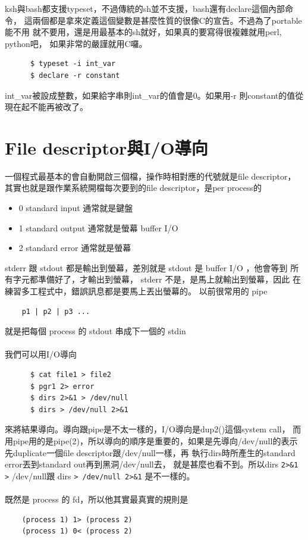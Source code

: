     ksh與bash都支援typeset，不過傳統的sh並不支援，bash還有declare這個內部命令，
    這兩個都是拿來定義這個變數是甚麼性質的很像C的宣告。不過為了portable能不用
    就不要用，還是用最基本的sh就好，如果真的要寫得很複雜就用perl, python吧，
    如果非常的嚴謹就用C囉。
    \begin{verbatim}
      $ typeset -i int_var
      $ declare -r constant
    \end{verbatim}
    int\_var被設成整數，如果給字串則int\_var的值會是0。如果用-r 
    則constant的值從現在起不能再被改了。

    \section{File descriptor與I/O導向}
    一個程式最基本的會自動開啟三個檔，操作時相對應的代號就是file descriptor，
    其實也就是跟作業系統開檔每次要到的file descriptor，是per process的
    \begin{itemize}
    \item 0  standard input   通常就是鍵盤
    \item 1  standard output  通常就是螢幕 buffer I/O
    \item 2  standard error   通常就是螢幕
    \end{itemize}
    stderr 跟 stdout 都是輸出到螢幕，差別就是 stdout 是 buffer I/O ，他會等到
    所有字元都準備好了，才輸出到螢幕， stderr 不是，是馬上就輸出到螢幕，因此
    在練習多工程式中，錯誤訊息都是要馬上丟出螢幕的。
    以前很常用的 pipe
    \begin{verbatim}
    p1 | p2 | p3 ...
    \end{verbatim}
    就是把每個 process 的 stdout 串成下一個的 stdin
    \\\\
    我們可以用I/O導向
    \begin{verbatim}
      $ cat file1 > file2
      $ pgr1 2> error
      $ dirs 2>&1 > /dev/null
      $ dirs > /dev/null 2>&1
    \end{verbatim}
    來將結果導向。導向跟pipe是不太一樣的，I/O導向是dup2()這個system call，
    而用pipe用的是pipe(2)，所以導向的順序是重要的，如果是先導向/dev/null的表示
    先duplicate一個file descriptor跟/dev/null一樣，再
    執行dirs時所產生的standard error丟到standard out再到黑洞/dev/null去，
    就是甚麼也看不到。所以dirs \verb=2>&1 >= /dev/null跟 
    dirs \verb=> /dev/null 2>&1= 是不一樣的。
    \\\\
    既然是 process 的 fd，所以他其實最真實的規則是
    \begin{verbatim}
    (process 1) 1> (process 2)
    (process 1) 0< (process 2)
    \end{verbatim}
